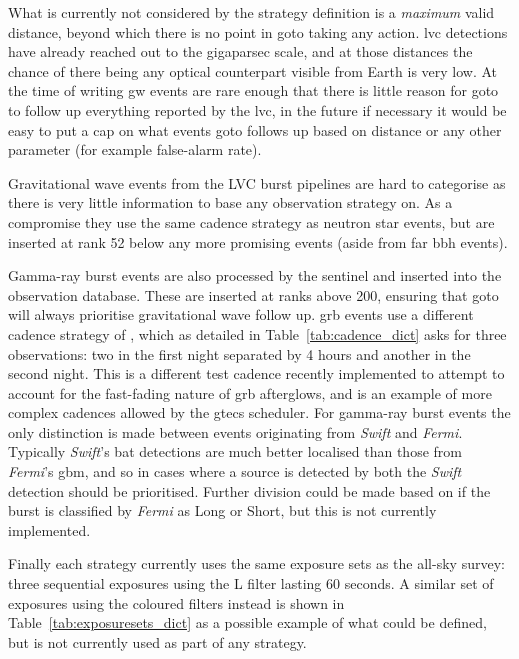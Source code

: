 \begin{colsection}
\begin{colsection}
What is currently not considered by the strategy definition is a \textit{maximum} valid distance, beyond which there is no point in \gls{goto} taking any action. \gls{lvc} detections have already reached out to the gigaparsec scale, and at those distances the chance of there being any optical counterpart visible from Earth is very low. At the time of writing \gls{gw} events are rare enough that there is little reason for \gls{goto} to follow up everything reported by the \gls{lvc}, in the future if necessary it would be easy to put a cap on what events \gls{goto} follows up based on distance or any other parameter (for example false-alarm rate).

Gravitational wave events from the LVC burst pipelines are hard to categorise as there is very little information to base any observation strategy on. As a compromise they use the same cadence strategy as neutron star events, but are inserted at rank 52 below any more promising events (aside from far \gls{bbh} events).

Gamma-ray burst events are also processed by the sentinel and inserted into the observation database. These are inserted at ranks above 200, ensuring that \gls{goto} will always prioritise gravitational wave follow up. \gls{grb} events use a different cadence strategy of , which as detailed in Table~\ref{tab:cadence_dict} asks for three observations: two in the first night separated by 4 hours and another in the second night. This is a different test cadence recently implemented to attempt to account for the fast-fading nature of \gls{grb} afterglows, and is an example of more complex cadences allowed by the \gls{gtecs} scheduler. For gamma-ray burst events the only distinction is made between events originating from \textit{Swift} and \textit{Fermi}. Typically \textit{Swift}'s \gls{bat} detections are much better localised than those from \textit{Fermi}'s \gls{gbm}, and so in cases where a source is detected by both the \textit{Swift} detection should be prioritised. Further division could be made based on if the burst is classified by \textit{Fermi} as Long or Short, but this is not currently implemented.

Finally each strategy currently uses the same exposure sets as the all-sky survey: three sequential exposures using the L filter lasting 60 seconds. A similar set of exposures using the coloured filters instead is shown in Table~\ref{tab:exposuresets_dict} as a possible example of what could be defined, but is not currently used as part of any strategy.


\end{colsection}
\end{colsection}
